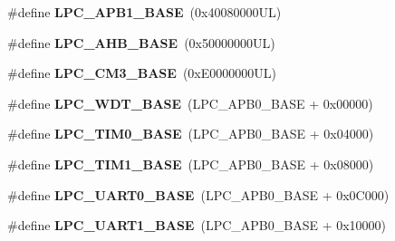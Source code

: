 \begin{DoxyCompactItemize}
\item 
\hypertarget{group___l_p_c17xx___system_ga0be6ea6a9e30a53b98bbff6502ea59dc}{\#define {\bfseries \-L\-P\-C\-\_\-\-A\-P\-B1\-\_\-\-B\-A\-S\-E}~(0x40080000\-U\-L)}\label{group___l_p_c17xx___system_ga0be6ea6a9e30a53b98bbff6502ea59dc}

\item 
\hypertarget{group___l_p_c17xx___system_ga8e0d25ffe3428ed27f963e83089046a8}{\#define {\bfseries \-L\-P\-C\-\_\-\-A\-H\-B\-\_\-\-B\-A\-S\-E}~(0x50000000\-U\-L)}\label{group___l_p_c17xx___system_ga8e0d25ffe3428ed27f963e83089046a8}

\item 
\hypertarget{group___l_p_c17xx___system_gaa42e7b1f24aad42d5102e3efcaee6bfa}{\#define {\bfseries \-L\-P\-C\-\_\-\-C\-M3\-\_\-\-B\-A\-S\-E}~(0x\-E0000000\-U\-L)}\label{group___l_p_c17xx___system_gaa42e7b1f24aad42d5102e3efcaee6bfa}

\item 
\hypertarget{group___l_p_c17xx___system_ga02a30b0be4672972c3af9e5aebdcfea1}{\#define {\bfseries \-L\-P\-C\-\_\-\-W\-D\-T\-\_\-\-B\-A\-S\-E}~(\-L\-P\-C\-\_\-\-A\-P\-B0\-\_\-\-B\-A\-S\-E + 0x00000)}\label{group___l_p_c17xx___system_ga02a30b0be4672972c3af9e5aebdcfea1}

\item 
\hypertarget{group___l_p_c17xx___system_ga1700e34b157bbb09165bb65d63df2032}{\#define {\bfseries \-L\-P\-C\-\_\-\-T\-I\-M0\-\_\-\-B\-A\-S\-E}~(\-L\-P\-C\-\_\-\-A\-P\-B0\-\_\-\-B\-A\-S\-E + 0x04000)}\label{group___l_p_c17xx___system_ga1700e34b157bbb09165bb65d63df2032}

\item 
\hypertarget{group___l_p_c17xx___system_ga0ea4655a35b46532f1811d8a1cbe66ab}{\#define {\bfseries \-L\-P\-C\-\_\-\-T\-I\-M1\-\_\-\-B\-A\-S\-E}~(\-L\-P\-C\-\_\-\-A\-P\-B0\-\_\-\-B\-A\-S\-E + 0x08000)}\label{group___l_p_c17xx___system_ga0ea4655a35b46532f1811d8a1cbe66ab}

\item 
\hypertarget{group___l_p_c17xx___system_gaa96fb70405a1298b350fc6f0ad0af997}{\#define {\bfseries \-L\-P\-C\-\_\-\-U\-A\-R\-T0\-\_\-\-B\-A\-S\-E}~(\-L\-P\-C\-\_\-\-A\-P\-B0\-\_\-\-B\-A\-S\-E + 0x0\-C000)}\label{group___l_p_c17xx___system_gaa96fb70405a1298b350fc6f0ad0af997}

\item 
\hypertarget{group___l_p_c17xx___system_ga18e8f96b25e3f343bdd7ba552ae7a617}{\#define {\bfseries \-L\-P\-C\-\_\-\-U\-A\-R\-T1\-\_\-\-B\-A\-S\-E}~(\-L\-P\-C\-\_\-\-A\-P\-B0\-\_\-\-B\-A\-S\-E + 0x10000)}\label{group___l_p_c17xx___system_ga18e8f96b25e3f343bdd7ba552ae7a617}


\end{DoxyCompactItemize}

